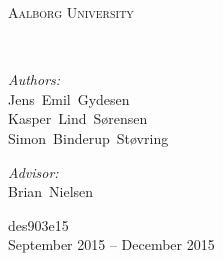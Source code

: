 \newcommand{\HRule}{\rule{\linewidth}{0.5mm}}
\begin{titlingpage}
  \begin{center}
    \vspace*{0.5cm}

    \textsc{\LARGE Aalborg University}\\[1.5cm]

    \vspace{2.5cm}

    {\HUGE \bfseries \productname{}}\\
    \vspace{0.2cm}
    {\small }

    \vspace{2.5cm}

    \begin{minipage}[t]{0.4\textwidth}
      \begin{flushleft} \large
        \emph{Authors:}\\
        Jens~Emil~Gydesen\\
        Kasper~Lind~Sørensen\\
        Simon~Binderup~Støvring
      \end{flushleft}
    \end{minipage}
    \begin{minipage}[t]{0.4\textwidth}
      \begin{flushright} \large
        \emph{Advisor:} \\
        Brian~Nielsen
      \end{flushright}
    \end{minipage}

    \vfill

    {\normalsize des903e15}\\
    {\large September 2015 -- December 2015}

  \end{center}
\end{titlingpage}
